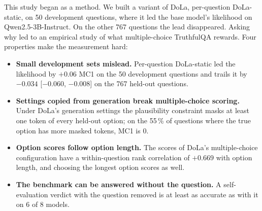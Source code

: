 \documentclass[11pt]{article}
\newcommand{\cha}[1]{\textsf{C#1}}
\newcommand{\method}{per-question DoLa-static}
\newcommand{\Method}{Per-question DoLa-static}
\newcommand{\mainmodel}{Qwen2.5-3B-Instruct}
\begin{document}
This study began as a method. We built a variant of DoLa, \method{}, on 50 development questions, where it led
the base model's likelihood on \mainmodel{}. On the other 767 questions the lead disappeared. Asking why led to an
empirical study of what multiple-choice TruthfulQA rewards. Four properties make the measurement hard:
\begin{itemize}
\item[\cha1] \textbf{Small development sets mislead.} \Method{} led the likelihood by $+0.06$ MC1 on the 50
  development questions and trails it by $-0.034$ [$-0.060$, $-0.008$] on the 767 held-out questions.
\item[\cha2] \textbf{Settings copied from generation break multiple-choice scoring.} Under DoLa's generation
  settings the plausibility constraint masks at least one token of every held-out option; on the 55\,\% of
  questions where the true option has more masked tokens, MC1 is 0.
\item[\cha3] \textbf{Option scores follow option length.} The scores of DoLa's multiple-choice configuration have a
  within-question rank correlation of $+0.669$ with option length, and choosing the longest option scores as well.
\item[\cha4] \textbf{The benchmark can be answered without the question.} A self-evaluation verdict with the
  question removed is at least as accurate as with it on 6 of 8 models.
\end{itemize}
\end{document}
